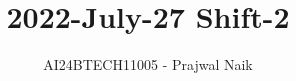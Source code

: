 \documentclass[journal]{IEEEtran}
\begin{document}

\vspace{3cm}

\title{2022-July-27 Shift-2}
\author{AI24BTECH11005 - Prajwal Naik}
{\let\newpage\relax\maketitle}

\renewcommand{\thefigure}{\theenumi}
\renewcommand{\thetable}{\theenumi}
\setlength{\intextsep}{10pt} %


\renewcommand{\thetable}{\theenumi}
\end{document}
